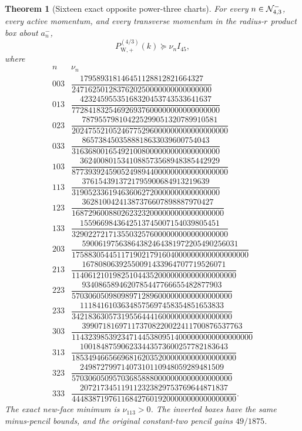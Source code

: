 \documentclass[11pt,oneside]{article}
\newtheorem{theorem}{Theorem}[section]
\theoremstyle{definition}
\theoremstyle{remark}
\begin{document}
\begin{theorem}[Sixteen exact opposite power-three charts]
\label{thm:newv48-sixteen-charts}
For every \(n\in{\cal N}_{4,3}^{-}\), every active momentum, and
every transverse momentum in the radius-\(r\) product box about
\(a_n^-\),
\[
 P_{\mathrm W,+}^{(4/3)}(k)\succeq\nu_n I_{45},       \tag{48.3}
\]
where
\[
\begin{array}{c|c}
n&\nu_n\\ \hline
003&\dfrac{179589318146451128812821664327}
{2471625012837620250000000000000000}\\[5pt]
013&\dfrac{42324595535168320453743533641637}
{772841832546926937600000000000000000}\\[5pt]
023&\dfrac{787955798104225299051320789910581}
{20247552105246775296000000000000000000}\\[5pt]
033&\dfrac{8657384503588818633039600754043}
{316368001654921008000000000000000000}\\[5pt]
103&\dfrac{3624008015341088573568948385442929}
{87739392459052498944000000000000000000}\\[5pt]
113&\dfrac{3761543913721795900684913219639}
{319052336194636062720000000000000000}\\[5pt]
123&\dfrac{36281004241387376607898887970427}
{1687296008802623232000000000000000000}\\[5pt]
133&\dfrac{1559669843642513745007154039805451}
{32902272171355032576000000000000000000}\\[5pt]
203&\dfrac{59006197563864382464381972205490256031}
{1758830544511719021791604000000000000000000}\\[5pt]
213&\dfrac{16780806392550091433964707719526071}
{1140612101982510443520000000000000000000}\\[5pt]
223&\dfrac{9340865894620785447766655482877903}
{570306050980989712896000000000000000000}\\[5pt]
233&\dfrac{11184161036348575697458354851653833}
{342183630573195564441600000000000000000}\\[5pt]
303&\dfrac{399071816971173708220022411700876537763}
{11432398539234714453809514000000000000000000}\\[5pt]
313&\dfrac{100184875906233443573600257782183643}
{1853494665669681620352000000000000000000}\\[5pt]
323&\dfrac{24987279971407310110948059289481509}
{570306050957036858880000000000000000000}\\[5pt]
333&\dfrac{207217345119112323829753769644871837}
{4448387197611684276019200000000000000000}.
\end{array}                                             \tag{48.4}
\]
The exact new-face minimum is \(\nu_{113}>0\).  The inverted
boxes have the same minus-pencil bounds, and the original
constant-two pencil gains \(49/1875\).
\end{theorem}
\end{document}
